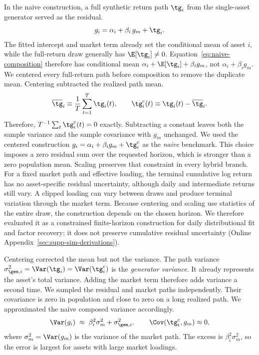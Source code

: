 In the naive construction, a full synthetic return path $\tg_i$ from
the single-asset generator served as the residual.
\begin{equation}\label{eq:naive-composition}
g_i = \alpha_i + \beta_i\, g_m + \tg_i.
\end{equation}
The fitted intercept and market term already set the conditional mean
of asset $i$, while the full-return draw generally has
$\E[\tg_i]\ne 0$. Equation~\eqref{eq:naive-composition} therefore has
conditional mean $\alpha_i+\E[\tg_i]+\beta_i g_m$, not
$\alpha_i+\beta_i g_m$.
We centered every full-return path before composition to remove the
duplicate mean. Centering subtracted the realized path mean.
\begin{equation}
  \overline{\tg}_i \equiv \frac{1}{T}\sum_{t=1}^{T}\tg_i(t),
  \qquad
  \tg_i^{\mathrm c}(t) \equiv \tg_i(t)-\overline{\tg}_i.
  \label{eq:center-generator}
\end{equation}
Therefore, $T^{-1}\sum_t\tg_i^{\mathrm c}(t)=0$ exactly. Subtracting a
constant leaves both the sample variance and the sample covariance with
$g_m$ unchanged. We used the centered construction
$g_i=\alpha_i+\beta_i g_m+\tg_i^{\mathrm c}$ as the \emph{naive}
benchmark. This choice imposes a zero residual sum over the requested
horizon, which is stronger than a zero population mean. Scaling
preserves that constraint in every hybrid branch. For a fixed market
path and effective loading, the terminal cumulative log return has no
asset-specific residual uncertainty, although daily and intermediate
returns still vary. A clipped loading can vary between draws and
produce terminal variation through the market term. Because centering
and scaling use statistics of the entire draw, the construction depends
on the chosen horizon. We therefore evaluated it as a constrained
finite-horizon construction for daily distributional fit and factor
recovery; it does not preserve cumulative residual uncertainty
(Online Appendix~\ref{sec:supp-sim-derivations}).

Centering corrected the mean but not the variance. The path variance
$\sigma_{\gen,i}^2=\Var(\tg_i)=\Var(\tg_i^{\mathrm c})$ is the
\emph{generator variance}. It already represents the asset's total
variance. Adding the market term therefore adds variance a
second time. We sampled the residual and market paths independently.
Their covariance is zero in population and close to zero on a long
realized path. We approximated the naive composed variance accordingly.
\begin{equation}
  \Var(g_i)
  \;\approx\; \beta_i^2\sigma_m^2 + \sigma_{\gen,i}^2,
  \qquad \Cov(\tg_i^{\mathrm c},g_m)\approx 0,
  \label{eq:naive-inflation}
\end{equation}
where $\sigma_m^2=\Var(g_m)$ is the variance of the market path. The
excess is $\beta_i^2\sigma_m^2$, so the error is largest for
assets with large market loadings.

